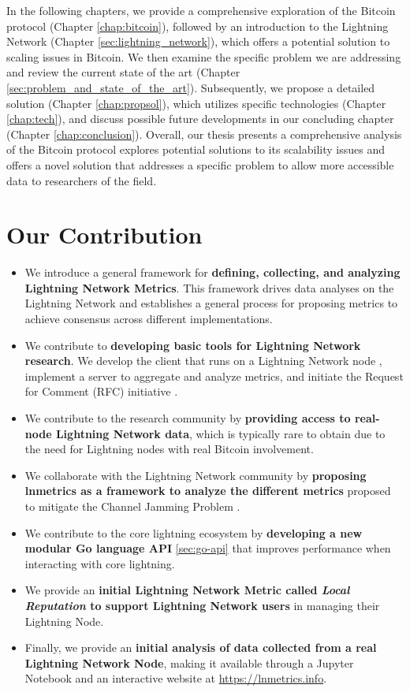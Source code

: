 In the following chapters, we provide a comprehensive exploration of the Bitcoin protocol
(Chapter \ref{chap:bitcoin}), followed by an introduction to the Lightning Network
(Chapter \ref{sec:lightning_network}), which offers a potential solution to scaling issues
in Bitcoin. We then examine the specific problem we are addressing and review the current
state of the art (Chapter \ref{sec:problem_and_state_of_the_art}). Subsequently, we propose
a detailed solution (Chapter \ref{chap:propsol}), which utilizes specific technologies
(Chapter \ref{chap:tech}), and discuss possible future developments in our concluding chapter
(Chapter \ref{chap:conclusion}). Overall, our thesis presents a comprehensive analysis of the
Bitcoin protocol explores potential solutions to its scalability issues and offers a novel
solution that addresses a specific problem to allow more accessible data to researchers of the
field.

\section*{Our Contribution}

\begin{itemize}
  \item We introduce a general framework for \textbf{defining, collecting, and analyzing Lightning Network Metrics}.
        This framework drives data analyses on the Lightning Network and establishes a general process for proposing metrics
        to achieve consensus across different implementations.
  \item We contribute to \textbf{developing basic tools for Lightning Network research}. We develop the client that runs
        on a Lightning Network node \cite{lnmetrics-client}, implement a server \cite{lnmetrics-server} to aggregate and
        analyze metrics, and initiate the Request for Comment (RFC) initiative \cite{lnmetrics-rfc}.
  \item We contribute to the research community by \textbf{providing access to real-node Lightning Network data},
        which is typically rare to obtain due to the need for Lightning nodes with real Bitcoin involvement.
  \item We collaborate with the Lightning Network community \cite{lightning-network-ml-post-on-jamming} by \textbf{proposing
        lnmetrics as a framework to analyze the different metrics} proposed to mitigate the Channel Jamming Problem \cite{cryptoeprint:2022/1454}.
  \item We contribute to the core lightning ecosystem by \textbf{developing a new modular Go language API} \ref{sec:go-api}
        that improves performance when interacting with core lightning.
  \item We provide an \textbf{initial Lightning Network Metric called \emph{Local Reputation} \cite{lnmetrics_localreputation}
        to support Lightning Network users} in managing their Lightning Node.
  \item Finally, we provide an \textbf{initial analysis of data collected from a real Lightning Network Node}, making it available
        through a Jupyter Notebook \cite{lnmetrics-jupyter} and an interactive website at \url{https://lnmetrics.info}.
\end{itemize}
